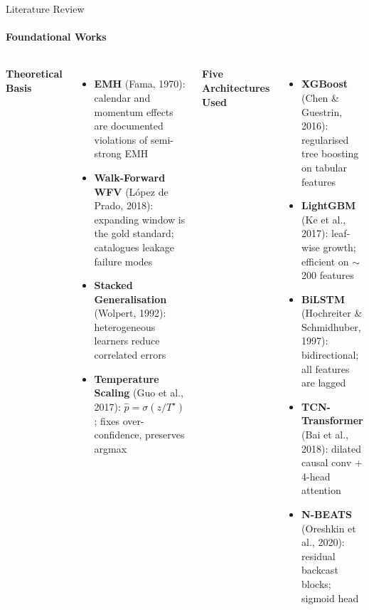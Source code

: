 \documentclass[10pt,aspectratio=43]{beamer}
\newcommand{\gd}[1]{\textcolor{secondary}{\textbf{#1}}}
\newcommand{\vsep}{\vspace{0.04cm}}
\begin{document}
\begin{frame}{Literature Review}
  \framesubtitle{Foundational Works}
  \begin{columns}[T]
      \gd{\textbf{Theoretical Basis}}
      \vsep
      \begin{itemize}\itemsep4pt
        \item \textbf{EMH} (Fama, 1970): calendar and momentum effects are documented violations of semi-strong EMH
        \item \textbf{Walk-Forward WFV} (L\'opez de Prado, 2018): expanding window is the gold standard; catalogues leakage failure modes
        \item \textbf{Stacked Generalisation} (Wolpert, 1992): heterogeneous learners reduce correlated errors
        \item \textbf{Temperature Scaling} (Guo et al., 2017): $\hat{p}=\sigma(z/T^\star)$; fixes over-confidence, preserves argmax
      \end{itemize}
      \gd{\textbf{Five Architectures Used}}
      \vsep
      \begin{itemize}\itemsep4pt
        \item \textbf{XGBoost} (Chen \& Guestrin, 2016): regularised tree boosting on tabular features
        \item \textbf{LightGBM} (Ke et al., 2017): leaf-wise growth; efficient on $\sim$200 features
        \item \textbf{BiLSTM} (Hochreiter \& Schmidhuber, 1997): bidirectional; all features are lagged
        \item \textbf{TCN-Transformer} (Bai et al., 2018): dilated causal conv + 4-head attention
        \item \textbf{N-BEATS} (Oreshkin et al., 2020): residual backcast blocks; sigmoid head
      \end{itemize}
  \end{columns}
\end{frame}
\end{document}
